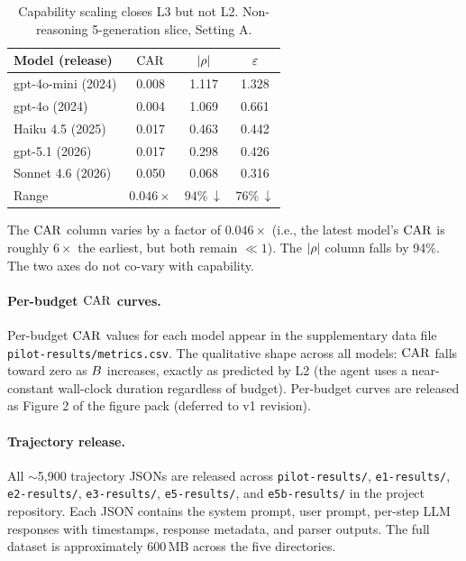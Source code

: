 \begin{table}[h]
\centering
\caption{Capability scaling closes L3 but not L2. Non-reasoning 5-generation slice, Setting A.}
\label{tab:generations}
\small
\begin{tabular}{lccc}
\toprule
Model (release) & $\mathrm{CAR}$ & $|\rho|$ & $\varepsilon$ \\
\midrule
gpt-4o-mini (2024) & 0.008 & 1.117 & 1.328 \\
gpt-4o (2024)      & 0.004 & 1.069 & 0.661 \\
Haiku 4.5 (2025)   & 0.017 & 0.463 & 0.442 \\
gpt-5.1 (2026)     & 0.017 & 0.298 & 0.426 \\
Sonnet 4.6 (2026)  & 0.050 & 0.068 & 0.316 \\
\midrule
Range            & $0.046\times$ & $94\%\,\downarrow$ & $76\%\,\downarrow$ \\
\bottomrule
\end{tabular}
\end{table}

The $\mathrm{CAR}$ column varies by a factor of $0.046\times$ (i.e., the latest model's $\mathrm{CAR}$ is roughly $6\times$ the earliest, but both remain $\ll 1$). The $|\rho|$ column falls by 94\%. The two axes do not co-vary with capability.

\paragraph{Per-budget $\mathrm{CAR}$ curves.}
Per-budget $\mathrm{CAR}$ values for each model appear in the supplementary data file \texttt{pilot-results/metrics.csv}. The qualitative shape across all models: $\mathrm{CAR}$ falls toward zero as $B$ increases, exactly as predicted by L2 (the agent uses a near-constant wall-clock duration regardless of budget). Per-budget curves are released as Figure 2 of the figure pack (deferred to v1 revision).

\paragraph{Trajectory release.}
All $\sim$5{,}900 trajectory JSONs are released across \texttt{pilot-results/}, \texttt{e1-results/}, \texttt{e2-results/}, \texttt{e3-results/}, \texttt{e5-results/}, and \texttt{e5b-results/} in the project repository. Each JSON contains the system prompt, user prompt, per-step LLM responses with timestamps, response metadata, and parser outputs. The full dataset is approximately 600\,MB across the five directories.

